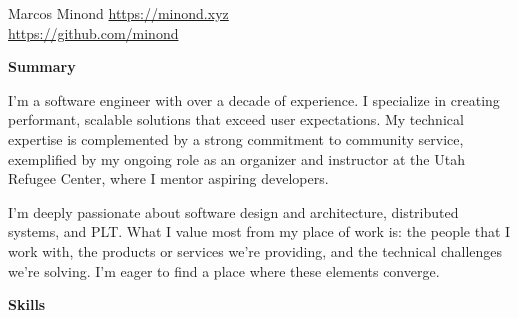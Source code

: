 \documentclass[10pt]{article}
\newcommand{\SectionTitle}[2][.2in] {
  \vspace{#1}
  \textbf{\large #2}
  \vspace{.1in}
}
\begin{document}
\begin{flushleft}

\huge{Marcos Minond} \normalsize
\hfill \href{https://minond.xyz}{https://minond.xyz} \\
\hfill \href{https://github.com/minond}{https://github.com/minond}

\normalsize


\SectionTitle[.025in]{Summary}

I'm a software engineer with over a decade of experience. I specialize in creating performant, scalable solutions that exceed user expectations. My technical expertise is complemented by a strong commitment to community service, exemplified by my ongoing role as an organizer and instructor at the Utah Refugee Center, where I mentor aspiring developers.

\vspace{.1in}

I'm deeply passionate about software design and architecture, distributed systems, and PLT. What I value most from my place of work is: the people that I work with, the products or services we're providing, and the technical challenges we're solving. I'm eager to find a place where these elements converge.


%

\SectionTitle{Skills}



\end{flushleft}
\end{document}
